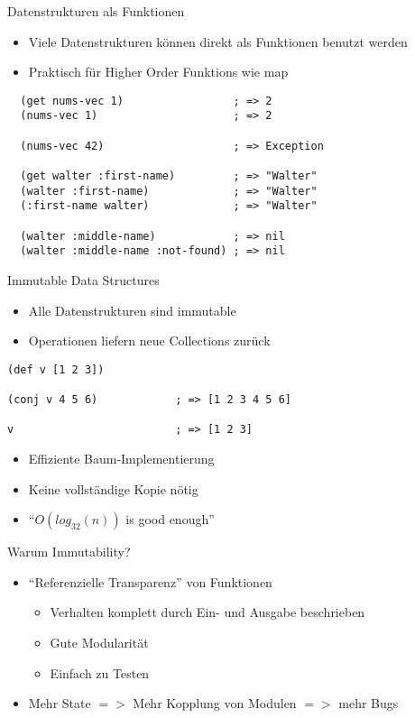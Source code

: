 \documentclass[presentation]{beamer}
\begin{document}
\begin{frame}[fragile]{Datenstrukturen als Funktionen}
  \begin{itemize}
  \item Viele Datenstrukturen können direkt als Funktionen benutzt werden
  \item Praktisch für Higher Order Funktions wie map
  \end{itemize}
  \begin{block}{}
\begin{verbatim}
  (get nums-vec 1)                 ; => 2
  (nums-vec 1)                     ; => 2

  (nums-vec 42)                    ; => Exception

  (get walter :first-name)         ; => "Walter"
  (walter :first-name)             ; => "Walter"
  (:first-name walter)             ; => "Walter"

  (walter :middle-name)            ; => nil
  (walter :middle-name :not-found) ; => nil
\end{verbatim}

  \end{block}
\end{frame}

\begin{frame}[fragile]{Immutable Data Structures}
  \begin{itemize}
  \item Alle Datenstrukturen sind immutable
  \item Operationen liefern neue Collections zurück
  \end{itemize}
  \begin{block}{}
\begin{verbatim}
(def v [1 2 3])

(conj v 4 5 6)            ; => [1 2 3 4 5 6]

v                         ; => [1 2 3]
\end{verbatim}
  \end{block}
  \begin{itemize}
  \item Effiziente Baum-Implementierung
  \item Keine vollständige Kopie nötig
  \item ``$O(log_{32}(n))$ is good enough''
  \end{itemize}
\end{frame}

\begin{frame}{Warum Immutability?}
  \begin{itemize}
  \item ``Referenzielle Transparenz'' von Funktionen
    \begin{itemize}
    \item Verhalten komplett durch Ein- und Ausgabe beschrieben
    \item Gute Modularität
    \item Einfach zu Testen
    \end{itemize}
  \item Mehr State $=>$ Mehr Kopplung von Modulen $=>$ mehr Bugs
  \end{itemize}
\end{frame}
\end{document}

